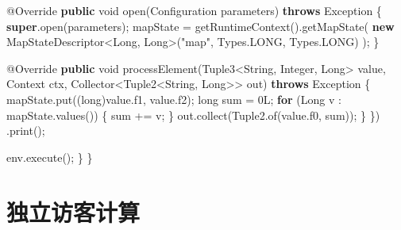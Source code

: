 \documentclass[cn,11pt,chinese]{elegantbook}
\newenvironment{Shaded}{}{}
\newcommand{\AttributeTok}[1]{\textcolor[rgb]{0.49,0.56,0.16}{#1}}
\newcommand{\BuiltInTok}[1]{#1}
\newcommand{\DataTypeTok}[1]{\textcolor[rgb]{0.56,0.13,0.00}{#1}}
\newcommand{\DecValTok}[1]{\textcolor[rgb]{0.25,0.63,0.44}{#1}}
\newcommand{\FunctionTok}[1]{\textcolor[rgb]{0.02,0.16,0.49}{#1}}
\newcommand{\KeywordTok}[1]{\textcolor[rgb]{0.00,0.44,0.13}{\textbf{#1}}}
\newcommand{\NormalTok}[1]{#1}
\newcommand{\StringTok}[1]{\textcolor[rgb]{0.25,0.44,0.63}{#1}}
\begin{document}
\begin{Shaded}
\begin{Highlighting}[]
                \AttributeTok{@Override}
                \KeywordTok{public} \DataTypeTok{void} \FunctionTok{open}\NormalTok{(}\BuiltInTok{Configuration}\NormalTok{ parameters) }\KeywordTok{throws} \BuiltInTok{Exception}\NormalTok{ \{}
                    \KeywordTok{super}\NormalTok{.}\FunctionTok{open}\NormalTok{(parameters);}
\NormalTok{                    mapState = }\FunctionTok{getRuntimeContext}\NormalTok{().}\FunctionTok{getMapState}\NormalTok{(}
                            \KeywordTok{new}\NormalTok{ MapStateDescriptor\textless{}}\BuiltInTok{Long}\NormalTok{, }\BuiltInTok{Long}\NormalTok{\textgreater{}(}\StringTok{"map"}\NormalTok{, }\BuiltInTok{Types}\NormalTok{.}\FunctionTok{LONG}\NormalTok{, }\BuiltInTok{Types}\NormalTok{.}\FunctionTok{LONG}\NormalTok{)}
\NormalTok{                    );}
\NormalTok{                \}}

                \AttributeTok{@Override}
                \KeywordTok{public} \DataTypeTok{void} \FunctionTok{processElement}\NormalTok{(Tuple3\textless{}}\BuiltInTok{String}\NormalTok{, }\BuiltInTok{Integer}\NormalTok{, }\BuiltInTok{Long}\NormalTok{\textgreater{} value, }\BuiltInTok{Context}\NormalTok{ ctx, Collector\textless{}Tuple2\textless{}}\BuiltInTok{String}\NormalTok{, }\BuiltInTok{Long}\NormalTok{\textgreater{}\textgreater{} out) }\KeywordTok{throws} \BuiltInTok{Exception}\NormalTok{ \{}
\NormalTok{                    mapState.}\FunctionTok{put}\NormalTok{((}\DataTypeTok{long}\NormalTok{)value.}\FunctionTok{f1}\NormalTok{, value.}\FunctionTok{f2}\NormalTok{);}
                    \DataTypeTok{long}\NormalTok{ sum = }\DecValTok{0L}\NormalTok{;}
                    \KeywordTok{for}\NormalTok{ (}\BuiltInTok{Long}\NormalTok{ v : mapState.}\FunctionTok{values}\NormalTok{()) \{}
\NormalTok{                        sum += v;}
\NormalTok{                    \}}
\NormalTok{                    out.}\FunctionTok{collect}\NormalTok{(Tuple2.}\FunctionTok{of}\NormalTok{(value.}\FunctionTok{f0}\NormalTok{, sum));}
\NormalTok{                \}}
\NormalTok{            \})}
\NormalTok{            .}\FunctionTok{print}\NormalTok{();}

\NormalTok{        env.}\FunctionTok{execute}\NormalTok{();}
\NormalTok{    \}}
\NormalTok{\}}
\end{Highlighting}
\end{Shaded}

\hypertarget{ux72ecux7acbux8bbfux5ba2ux8ba1ux7b97}{%
\section{独立访客计算}\label{ux72ecux7acbux8bbfux5ba2ux8ba1ux7b97}}
\end{document}
